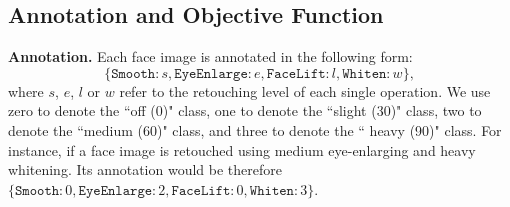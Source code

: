 \documentclass[sigconf]{acmart}
\begin{document}
\subsection{Annotation and Objective Function}
\noindent\textbf{Annotation.} Each face image is annotated in the following form: 
\begin{equation}
    \{\texttt{Smooth}: s,\texttt{EyeEnlarge}: e,\texttt{FaceLift}: l,\texttt{Whiten}: 
    w\},
    \nonumber
\end{equation}
where $s$, $e$, $l$ or $w$ refer to the retouching level of each single operation.
We use zero to denote the ``off (0)" class, one to denote the ``slight (30)" class, two to denote the ``medium (60)" class, and three to denote the `` heavy (90)" class.
For instance, if a face image is retouched using medium eye-enlarging and heavy whitening. Its annotation would be therefore $
    \{\texttt{Smooth}: 0,\texttt{EyeEnlarge}: 2,\texttt{FaceLift}: 0,\texttt{Whiten}: 
    3\}$.
\end{document}
